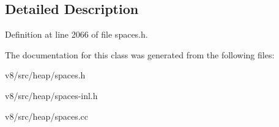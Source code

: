 \subsection{Detailed Description}


Definition at line 2066 of file spaces.\+h.



The documentation for this class was generated from the following files\+:\begin{DoxyCompactItemize}
\item 
v8/src/heap/spaces.\+h\item 
v8/src/heap/spaces-\/inl.\+h\item 
v8/src/heap/spaces.\+cc\end{DoxyCompactItemize}
